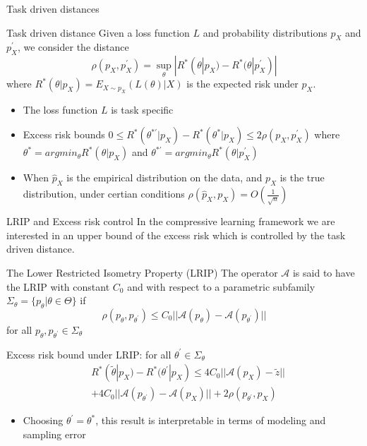 

\begin{frame}{Task driven distances}
\begin{block}{Task driven distance}
Given a loss function $L$ and probability distributions $p_X$ and $p_X^'$, we consider the distance 
\begin{equation*}
    \rho(p_X,p_{X}^{'} )=\sup_{\theta}|R^*(\theta|p_X)-R^*(\theta|p_{X}^{'})|  
\end{equation*}
where $R^*(\theta|p_X)=E_{X\sim p_X}(L(\theta)|X)$ is the expected risk under $p_X$.
\end{block}
\begin{itemize}
    \item The loss function $L$ is task specific
    \item Excess risk bounds $0\leq R^*(\theta^{*'}|p_X)-R^*(\theta^{*}|p_X)\leq 2\rho(p_X,p_{X}^{'}) $ where $\theta^*=argmin_{\theta} R^*(\theta|p_X)$ and $\theta^{*'}=argmin_{\theta} R^*(\theta|p_{X}^{'})$
    \item When $\hat{p}_X$ is the empirical distribution on the data, and $p_X$ is the true distribution, under certian conditions $\rho(\hat{p}_X,p_X)=O(\frac{1}{\sqrt{n}})$
\end{itemize}

\end{frame}

\begin{frame}{LRIP and Excess risk control}
In the compressive learning framework we are interested in an upper bound of the excess risk which is controlled by the task driven distance.
\begin{block}{
The Lower Restricted Isometry Property (LRIP) } The operator $\mathcal{A}$ is said to have the LRIP with constant $C_0$ and with respect to a parametric subfamily $\Sigma_{\theta}=\{p_{\theta}|\theta\in\Theta\}$ if
\begin{equation*}
    \rho(p_{\theta},p_{\theta^{'}})\leq C_0 ||\mathcal{A}(p_{\theta})-\mathcal{A}(p_{\theta^{'}})||
\end{equation*}
for all $p_{\theta},p_{\theta^{'}}\in\Sigma_{\theta}$
\end{block}

Excess risk bound under LRIP: for all $\theta^{'}\in\Sigma_{\theta}$ 
    \begin{equation*}
    \begin{split}
        &R^*(\tilde{\theta}|p_X)-R^*(\theta^{'}|p_X)\leq 4C_0||\mathcal{A}(p_X)-\tilde{z}||\\
        &+4C_0||\mathcal{A}(p_{\theta^{'}})-\mathcal{A}(p_X)||+2\rho(p_{\theta^{'}},p_X)
    \end{split}
    \end{equation*}

\begin{itemize}
    \item Choosing $\theta^{'}=\theta^*$, this result is interpretable in terms of modeling and sampling error
\end{itemize}

    

\end{frame}

